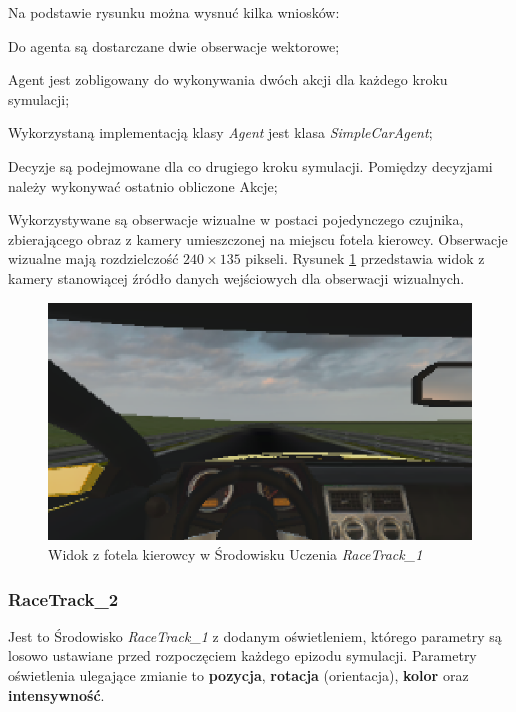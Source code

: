 \noindent
Na podstawie rysunku można wysnuć kilka wniosków:
\vspace{-0.5cm}
\begin{itemize*}
\item Do agenta są dostarczane dwie obserwacje wektorowe;
\item Agent jest zobligowany do wykonywania dwóch akcji dla każdego kroku symulacji;
\item Wykorzystaną implementacją klasy \textit{Agent} jest klasa \textit{SimpleCarAgent};
\item Decyzje są podejmowane dla co drugiego kroku symulacji. Pomiędzy decyzjami należy wykonywać ostatnio obliczone Akcje;
\item Wykorzystywane są obserwacje wizualne w postaci pojedynczego czujnika, zbierającego obraz z kamery umieszczonej na miejscu fotela kierowcy. Obserwacje wizualne mają rozdzielczość $240 \times 135$ pikseli. Rysunek \ref{RaceTrack1Cockpit} przedstawia widok z kamery stanowiącej źródło danych wejściowych dla obserwacji wizualnych.
\end{itemize*}

\begin{figure}[h]
\begin{center}
\includegraphics[width=15cm]{resources/figures/race_track_1_cockpit.png}
\caption{Widok z fotela kierowcy w Środowisku Uczenia \textit{RaceTrack\_1}}
\label{RaceTrack1Cockpit}
\end{center}
\end{figure}

\subsubsection{RaceTrack\_2}
Jest to Środowisko \textit{RaceTrack\_1} z dodanym oświetleniem, którego parametry są losowo ustawiane przed rozpoczęciem każdego epizodu symulacji. Parametry oświetlenia ulegające zmianie to \textbf{pozycja}, \textbf{rotacja} (orientacja), \textbf{kolor} oraz \textbf{intensywność}.


